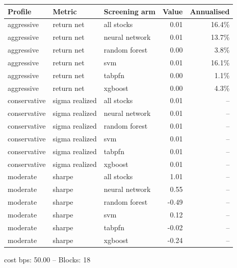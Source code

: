 \begin{threeparttable}
\small
\setlength{\tabcolsep}{4pt}
\begin{tabularx}{\linewidth}{>{\raggedright\arraybackslash}Xllrr}
\toprule
Profile & Metric & Screening arm & Value & Annualised \\
\midrule
aggressive & return net & all stocks & 0.01 & 16.4\% \\
aggressive & return net & neural network & 0.01 & 13.7\% \\
aggressive & return net & random forest & 0.00 & 3.8\% \\
aggressive & return net & svm & 0.01 & 16.1\% \\
aggressive & return net & tabpfn & 0.00 & 1.1\% \\
aggressive & return net & xgboost & 0.00 & 4.3\% \\
conservative & sigma realized & all stocks & 0.01 & -- \\
conservative & sigma realized & neural network & 0.01 & -- \\
conservative & sigma realized & random forest & 0.01 & -- \\
conservative & sigma realized & svm & 0.01 & -- \\
conservative & sigma realized & tabpfn & 0.01 & -- \\
conservative & sigma realized & xgboost & 0.01 & -- \\
moderate & sharpe & all stocks & 1.01 & -- \\
moderate & sharpe & neural network & 0.55 & -- \\
moderate & sharpe & random forest & -0.49 & -- \\
moderate & sharpe & svm & 0.12 & -- \\
moderate & sharpe & tabpfn & -0.02 & -- \\
moderate & sharpe & xgboost & -0.24 & -- \\
\bottomrule
\end{tabularx}
\begin{tablenotes}[flushleft]\footnotesize
  \item cost bps: 50.00 -- Blocks: 18
\end{tablenotes}
\end{threeparttable}
